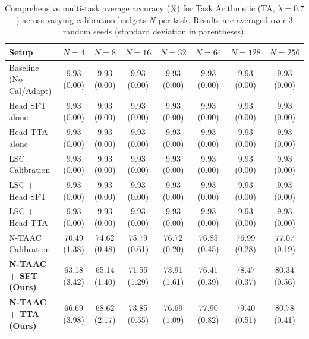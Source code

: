 \begin{table}[ht]
\centering
\caption{Comprehensive multi-task average accuracy (\%) for Task Arithmetic (TA, $\lambda=0.7$) across varying calibration budgets $N$ per task. Results are averaged over 3 random seeds (standard deviation in parentheses).}
\label{tab:appendix_ta_07}
\vskip 0.15in
\begin{sc}
\begin{scriptsize}
\setlength{\tabcolsep}{3pt}
\begin{tabular}{lccccccc}
\toprule
Setup & $N=4$ & $N=8$ & $N=16$ & $N=32$ & $N=64$ & $N=128$ & $N=256$ \\
\midrule
Baseline (No Cal/Adapt) & 9.93 (0.00) & 9.93 (0.00) & 9.93 (0.00) & 9.93 (0.00) & 9.93 (0.00) & 9.93 (0.00) & 9.93 (0.00) \\
Head SFT alone & 9.93 (0.00) & 9.93 (0.00) & 9.93 (0.00) & 9.93 (0.00) & 9.93 (0.00) & 9.93 (0.00) & 9.93 (0.00) \\
Head TTA alone & 9.93 (0.00) & 9.93 (0.00) & 9.93 (0.00) & 9.93 (0.00) & 9.93 (0.00) & 9.93 (0.00) & 9.93 (0.00) \\
LSC Calibration & 9.93 (0.00) & 9.93 (0.00) & 9.93 (0.00) & 9.93 (0.00) & 9.93 (0.00) & 9.93 (0.00) & 9.93 (0.00) \\
LSC + Head SFT & 9.93 (0.00) & 9.93 (0.00) & 9.93 (0.00) & 9.93 (0.00) & 9.93 (0.00) & 9.93 (0.00) & 9.93 (0.00) \\
LSC + Head TTA & 9.93 (0.00) & 9.93 (0.00) & 9.93 (0.00) & 9.93 (0.00) & 9.93 (0.00) & 9.93 (0.00) & 9.93 (0.00) \\
N-TAAC Calibration & 70.49 (1.38) & 74.62 (0.48) & 75.79 (0.61) & 76.72 (0.20) & 76.85 (0.45) & 76.99 (0.28) & 77.07 (0.19) \\
\textbf{N-TAAC + SFT (Ours)} & 63.18 (3.42) & 65.14 (1.40) & 71.55 (1.29) & 73.91 (1.61) & 76.41 (0.39) & 78.47 (0.37) & 80.34 (0.56) \\
\textbf{N-TAAC + TTA (Ours)} & 66.69 (3.98) & 68.62 (2.17) & 73.85 (0.55) & 76.69 (1.09) & 77.90 (0.82) & 79.40 (0.51) & 80.78 (0.41) \\
\bottomrule
\end{tabular}
\end{scriptsize}
\end{sc}
\end{table}

